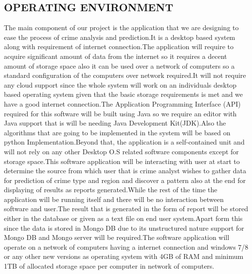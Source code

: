 \documentclass[12pt]{extreport}
\begin{document}
     \subsection{OPERATING ENVIRONMENT}
\hspace*{5em}The main component of our project is the application that we are designing to ease the process of crime analysis and prediction.It is a desktop based system along with requirement of internet connection.The application will require to acquire significant  amount of data from the internet so it requires a decent amount of storage space also it can be used over a network of computers so a standard configuration of the computers over network required.It will not require any cloud support since the whole system will work on an individuals desktop based operating system given that the basic storage requirements is met and we have a good internet connection.The Application Programming Interface (API) required for this software will be built using Java so we require an editor with Java support that is will be needing Java Development  Kit(JDK).Also the algorithms that are going to be implemented in the system will be based on python Implementation.Beyond that, the application is a self-contained unit and will not rely on any other Desktop O.S related software components except for storage space.This software application will be interacting with user at start to determine the source from which user that is crime analyst wishes to gather data for prediction of crime type and region and discover a pattern also at the end for displaying of results as reports generated.While the rest of the time the application will be running itself and there will be no interaction between software and user.The result that is generated in the form of report will be stored either in the database or given as a text file on end user system.Apart form this since the data is stored in Mongo DB  due to its unstructured nature support for Mongo DB and Mongo server will be required.The software application will operate on a network of computers having a internet connection and windows 7/8 or any other new versions as operating system with 4GB of RAM and minimum 1TB of allocated storage space per computer in network of computers.
\end{document}
